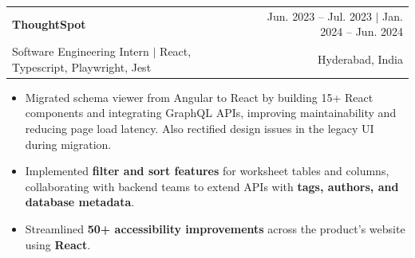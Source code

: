 \documentclass[letterpaper,11pt]{article}
\makeatletter
\newcommand{\resumeItem}[1]{%
  \item\small{#1}%
}
\newcommand{\resumeSubheading}[4]{
  \vspace{-2pt}\item
    \begin{tabular*}{0.97\textwidth}[t]{l@{\extracolsep{\fill}}r}
      \textbf{#1} & #2 \\
      {\small#3} & {\small #4} \\
    \end{tabular*}\vspace{-7pt}
}
\newcommand{\resumeItemListStart}{%
  \begin{itemize}[itemsep=0pt, parsep=0pt, topsep=0pt, partopsep=0pt]
}
\newcommand{\resumeItemListEnd}{\end{itemize}\vspace{-5pt}}
\makeatother
\begin{document}
    \resumeSubheading
      {ThoughtSpot}{Jun. 2023 -- Jul. 2023 $|$ Jan. 2024 -- Jun. 2024}
      {Software Engineering Intern $|$ {React, Typescript, Playwright, Jest}}{Hyderabad, India}
      \resumeItemListStart
        \resumeItem{Migrated schema viewer from Angular to React by building 15+ React components and integrating GraphQL APIs, improving maintainability and reducing page load latency. Also rectified design issues in the legacy UI during migration.}
        \resumeItem{Implemented \textbf{filter and sort features} for worksheet tables and columns, collaborating with backend teams to extend APIs with \textbf{tags, authors, and database metadata}.}
        \resumeItem{Streamlined \textbf{50+ accessibility improvements} across the product's website using \textbf{React}.}
      \resumeItemListEnd


\end{document}
